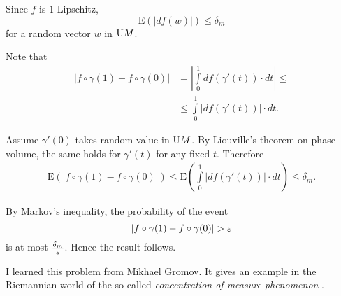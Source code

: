 Since $f$ is $1$-Lipschitz,
\[\mathrm{E}(|df(w)|)\le\delta_m\]
for a random vector $w$ in $\mathrm{U} M$.


Note that 
\begin{align*}
|f\circ \gamma(1)-f\circ\gamma(0)|
&=
\left|\int\limits_0^1df(\gamma'(t))\cdot dt\right|\le \\
&\le \int\limits_0^1\left|df(\gamma'(t))\right|\cdot dt.
\end{align*}

Assume $\gamma'(0)$
takes random value in $\mathrm{U} M$.
By Liouville's theorem on phase volume, the same holds for $\gamma'(t)$
for any fixed $t$.
Therefore
\begin{align*}
\mathrm{E}(|f\circ \gamma(1)-f\circ\gamma(0)|)\le \mathrm{E}\left(\int\limits_0^1|df(\gamma'(t))|\cdot dt\right)\le\delta_m.
\end{align*}

By Markov's inequality,
the probability of the event 
\[|f\circ \gamma(1)-f\circ\gamma(0)|>\eps\]
is at most $\tfrac{\delta_m}{\varepsilon}$.
Hence the result follows.
\qeds

I learned this problem from Mikhael Gromov.
It gives an example in the Riemannian world
of the so called 
\emph{concentration of measure phenomenon}
\cite[see][]{milman-schechtman,ledoux}.
